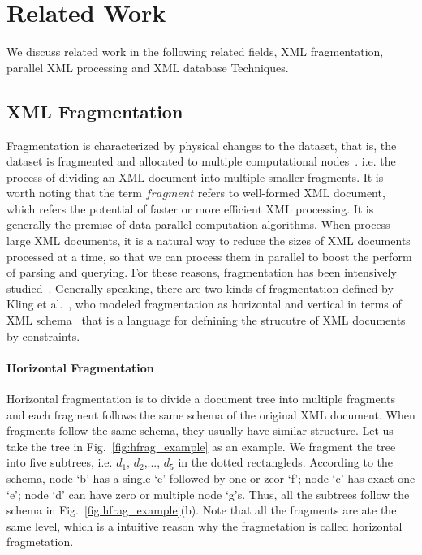 
\chapter{Related Work} \label{sec:relatedwork}

We discuss related work in the following related fields, XML fragmentation,
parallel XML processing and XML database Techniques.

\section{XML Fragmentation} 

Fragmentation is characterized by physical changes to the dataset, that is, the
dataset is fragmented and allocated to multiple computational
nodes~\cite{BrMa14}. i.e. the process of dividing an XML document into multiple
smaller fragments. It is worth noting that the term $fragment$ refers to
well-formed XML document, which refers the potential of faster or more efficient
XML processing. It is generally the premise of data-parallel computation
algorithms. When process large XML documents, it is a natural way to reduce the
sizes of XML documents processed at a time, so that we can process them in
parallel to boost the perform of parsing and querying. For these reasons,
fragmentation has been intensively studied~\cite{ARBM06,DaGP14,CFKL12,NEMH07,
OgTP13,LiZZ17, CFKL12,DaGP14}. Generally speaking, there are two kinds of
fragmentation defined by Kling et al.~\cite{kling11:dist_xml}, who modeled
fragmentation as horizontal and vertical in terms of XML schema~\cite{schema}
that is a language for defnining the strucutre of XML documents by constraints. 

\subsubsection{Horizontal Fragmentation} \label{sec:hfragment}

Horizontal fragmentation is to divide a document tree into multiple fragments
and each fragment follows the same schema of the original XML document. When
fragments follow the same schema, they usually have similar structure.  Let us
take the tree in Fig.~\ref{fig:hfrag_example} as an example. We fragment the
tree into five subtrees, i.e. $d_1$, $d_2$,..., $d_5$ in the dotted rectangleds.
According to the schema, node `b' has a single `e' followed by one or zeor  `f';
node `c' has exact one `e'; node `d' can have zero or multiple node `g's. Thus,
all the subtrees follow the schema in Fig.~\ref{fig:hfrag_example}(b). Note that
all the fragments are ate the same level, which is a intuitive reason why the
fragmetation is called horizontal fragmetation.


